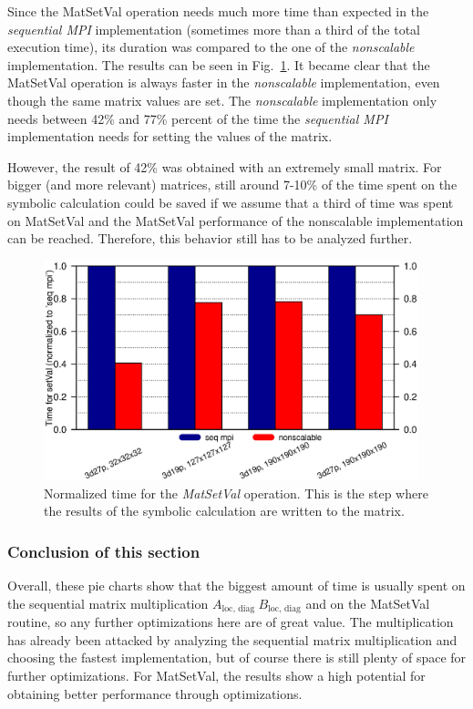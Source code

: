 Since the MatSetVal operation needs much more time than expected in the \textit{sequential MPI} implementation (sometimes more than a third of the total execution time), its duration was compared to the one of the \textit{nonscalable} implementation. The results can be seen in Fig.~\ref{fig:setvalues}. It became clear that the {MatSetVal} operation is always faster in the \textit{nonscalable} implementation, even though the same matrix values are set. The \textit{nonscalable} implementation only needs between 42\% and 77\% percent of the time the \textit{sequential MPI} implementation needs for setting the values of the matrix. 

However, the result of 42\% was obtained with an extremely small matrix. For bigger (and more relevant) matrices, still around 7-10\% of the time spent on the symbolic calculation could be saved if we assume that a third of time was spent on {MatSetVal} and the {MatSetVal} performance of the {nonscalable} implementation can be reached.  Therefore, this behavior still has to be analyzed further.


\begin{figure}[tbp]
	\centering
	\includegraphics[width=0.97\textwidth, trim={0 2cm 0 7.cm},clip]{setvalues}
	\caption{Normalized time for the \textit{MatSetVal} operation. This is the step where the results of the symbolic calculation are written to the matrix.} 
	\label{fig:setvalues}
\end{figure}

\subsubsection*{Conclusion of this section}
Overall, these pie charts show that the biggest amount of time is usually spent on the sequential matrix multiplication $A_{\textrm{loc, diag~}} B_{\textrm{loc, diag}}$ and on the MatSetVal routine, so any further optimizations here are of great value. The multiplication has already been attacked by analyzing the sequential matrix multiplication and choosing the fastest implementation, but of course there is still plenty of space for further optimizations. For MatSetVal, the results show a high potential for obtaining better performance through optimizations.


